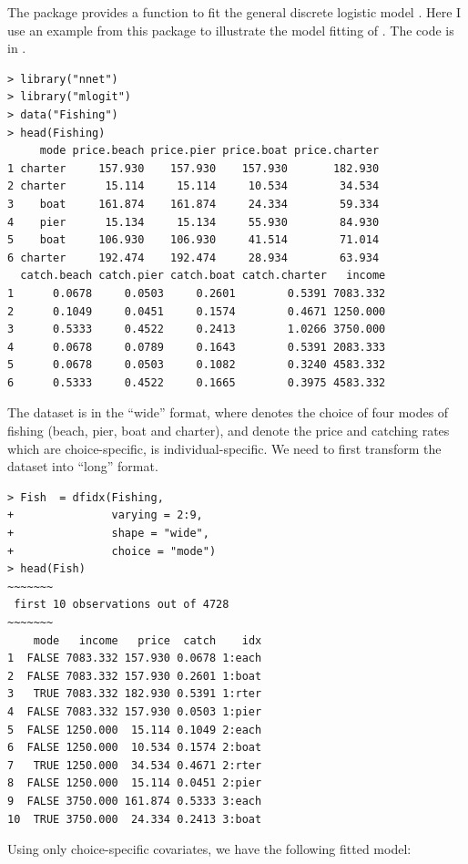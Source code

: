The  package  provides a function  to fit the general discrete logistic model \citep{croissant2020estimation}. 
Here I use an example from this package to illustrate the model fitting of . The  code is in .
\begin{lstlisting}
> library("nnet")
> library("mlogit")
> data("Fishing")
> head(Fishing)
     mode price.beach price.pier price.boat price.charter
1 charter     157.930    157.930    157.930       182.930
2 charter      15.114     15.114     10.534        34.534
3    boat     161.874    161.874     24.334        59.334
4    pier      15.134     15.134     55.930        84.930
5    boat     106.930    106.930     41.514        71.014
6 charter     192.474    192.474     28.934        63.934
  catch.beach catch.pier catch.boat catch.charter   income
1      0.0678     0.0503     0.2601        0.5391 7083.332
2      0.1049     0.0451     0.1574        0.4671 1250.000
3      0.5333     0.4522     0.2413        1.0266 3750.000
4      0.0678     0.0789     0.1643        0.5391 2083.333
5      0.0678     0.0503     0.1082        0.3240 4583.332
6      0.5333     0.4522     0.1665        0.3975 4583.332
\end{lstlisting}

The dataset  is in the ``wide'' format, where  denotes the choice of four modes of fishing (beach, pier, boat and charter),  and  denote the price and catching rates which are choice-specific,  is individual-specific. 
We need to first transform the dataset into ``long'' format.

\begin{lstlisting}
> Fish  = dfidx(Fishing, 
+               varying = 2:9, 
+               shape = "wide", 
+               choice = "mode")
> head(Fish)
~~~~~~~
 first 10 observations out of 4728 
~~~~~~~
    mode   income   price  catch    idx
1  FALSE 7083.332 157.930 0.0678 1:each
2  FALSE 7083.332 157.930 0.2601 1:boat
3   TRUE 7083.332 182.930 0.5391 1:rter
4  FALSE 7083.332 157.930 0.0503 1:pier
5  FALSE 1250.000  15.114 0.1049 2:each
6  FALSE 1250.000  10.534 0.1574 2:boat
7   TRUE 1250.000  34.534 0.4671 2:rter
8  FALSE 1250.000  15.114 0.0451 2:pier
9  FALSE 3750.000 161.874 0.5333 3:each
10  TRUE 3750.000  24.334 0.2413 3:boat
\end{lstlisting}

Using only choice-specific covariates, we have the following fitted model:

